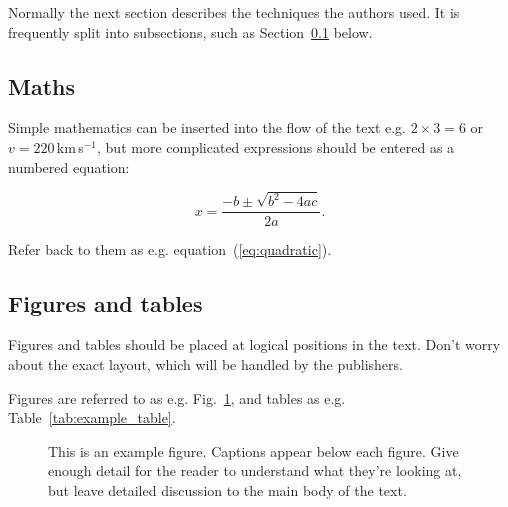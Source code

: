 \documentclass[a4paper,fleqn,usenatbib]{mnras}
\begin{document}


Normally the next section describes the techniques the authors used.
It is frequently split into subsections, such as Section~\ref{sec:maths} below.

\subsection{Maths}
\label{sec:maths} %

Simple mathematics can be inserted into the flow of the text e.g. $2\times3=6$
or $v=220$\,km\,s$^{-1}$, but more complicated expressions should be entered
as a numbered equation:

\begin{equation}
    x=\frac{-b\pm\sqrt{b^2-4ac}}{2a}.
	\label{eq:quadratic}
\end{equation}

Refer back to them as e.g. equation~(\ref{eq:quadratic}).

\subsection{Figures and tables}

Figures and tables should be placed at logical positions in the text. Don't
worry about the exact layout, which will be handled by the publishers.

Figures are referred to as e.g. Fig.~\ref{fig:example_figure}, and tables as
e.g. Table~\ref{tab:example_table}.

\begin{figure}
    \caption{This is an example figure. Captions appear below each figure.
	Give enough detail for the reader to understand what they're looking at,
	but leave detailed discussion to the main body of the text.}
    \label{fig:example_figure}
\end{figure}
\end{document}
